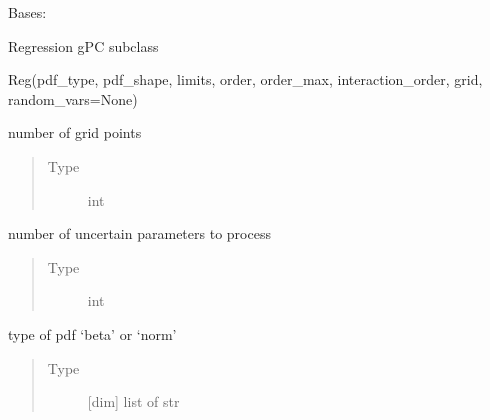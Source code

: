 \documentclass[letterpaper,10pt,english,openany,oneside]{sphinxmanual}
\begin{document}
\begin{fulllineitems}
\label{\detokenize{pygpc:pygpc.reg.Reg}}
Bases: {\hyperref[\detokenize{pygpc:pygpc.gpc.gPC}]{}}

Regression gPC subclass

Reg(pdf\_type, pdf\_shape, limits, order, order\_max, interaction\_order, grid, random\_vars=None)

\begin{fulllineitems}
\label{\detokenize{pygpc:pygpc.reg.Reg.N_grid}}
number of grid points
\begin{quote}\begin{description}
\item[{Type}] \leavevmode
int

\end{description}\end{quote}

\end{fulllineitems}


\begin{fulllineitems}
\label{\detokenize{pygpc:pygpc.reg.Reg.dim}}
number of uncertain parameters to process
\begin{quote}\begin{description}
\item[{Type}] \leavevmode
int

\end{description}\end{quote}

\end{fulllineitems}


\begin{fulllineitems}
\label{\detokenize{pygpc:pygpc.reg.Reg.pdf_type}}
type of pdf ‘beta’ or ‘norm’
\begin{quote}\begin{description}
\item[{Type}] \leavevmode
{[}dim{]} list of str


\end{description}
\end{quote}
\end{fulllineitems}
\end{fulllineitems}
\end{document}
